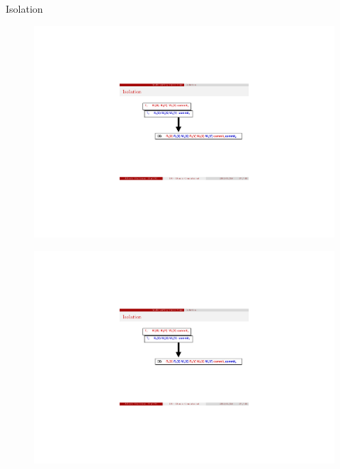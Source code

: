    

\begin{frame}{Isolation}
\begin{overprint}
\begin{figure}	
	\includegraphics[width=\textwidth,page=1]{fig4-isolation.pdf}
\end{figure}
\begin{figure}	
	\includegraphics[width=\textwidth,page=2]{fig4-isolation.pdf}
\end{figure}
\begin{figure}	

\end{figure}
\end{overprint}
\end{frame}

